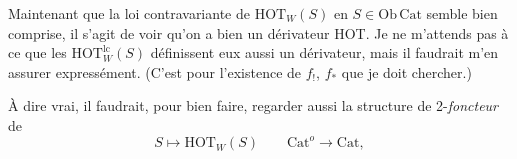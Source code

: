 \documentclass[11pt]{article}
\newcommand{\msp}[1]{\marginpar{\footnotesize [#1]}}
\newcommand{\HOT}{\mathrm{HOT}}
\newcommand{\Cat}{\mathrm{Cat}}
\begin{document}
Maintenant que la loi contravariante de $\HOT_W(S)$ en $S \in \mathrm{Ob}\,\Cat$ semble bien comprise, il s'agit de voir qu'on a bien un dérivateur HOT. Je ne m'attends pas à ce que les $\HOT_W^{\mathrm{lc}}(S)$
\msp{page 128}
définissent eux aussi un dérivateur, mais il faudrait m'en assurer expressément. (C'est pour l'existence de $f_!$, $f_*$ que je doit chercher.) %

À dire vrai, il faudrait, pour bien faire, regarder aussi la structure de 2-\textit{foncteur} de
\[
S \longmapsto \HOT_W(S) \qquad \Cat^o \longrightarrow \Cat,
\]
\end{document}
